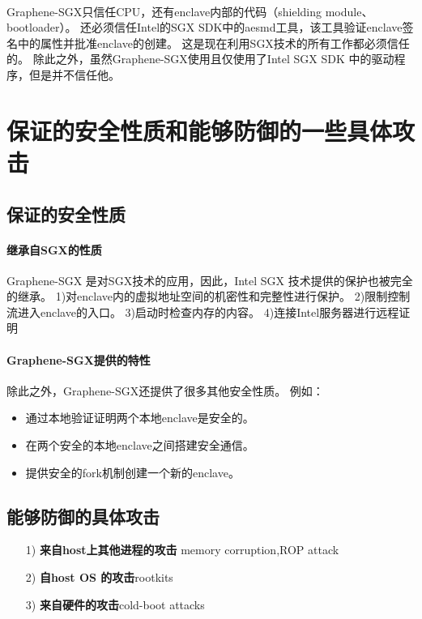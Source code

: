\documentclass{article}
\begin{document}
\paragraph{}
Graphene-SGX只信任CPU，还有enclave内部的代码（shielding module、bootloader）。
还必须信任Intel的SGX SDK中的aesmd工具，该工具验证enclave签名中的属性并批准enclave的创建。
这是现在利用SGX技术的所有工作都必须信任的。
除此之外，虽然Graphene-SGX使用且仅使用了Intel SGX SDK 中的驱动程序，但是并不信任他。

\section{保证的安全性质和能够防御的一些具体攻击}
\subsection{保证的安全性质}
\paragraph{继承自SGX的性质}
Graphene-SGX 是对SGX技术的应用，因此，Intel SGX 技术提供的保护也被完全的继承。
1)对enclave内的虚拟地址空间的机密性和完整性进行保护。
2)限制控制流进入enclave的入口。
3)启动时检查内存的内容。
4)连接Intel服务器进行远程证明

\paragraph{Graphene-SGX提供的特性}
除此之外，Graphene-SGX还提供了很多其他安全性质。
例如：
\begin{itemize}
    \item 通过本地验证证明两个本地enclave是安全的。
    \item 在两个安全的本地enclave之间搭建安全通信。
    \item 提供安全的fork机制创建一个新的enclave。
\end{itemize}

\subsection{能够防御的具体攻击}
\begin{itemize}
    \item [1)]\textbf{来自host上其他进程的攻击} memory corruption,ROP attack
    \item [2)]\textbf{自host OS 的攻击}rootkits
    \item [3)]\textbf{来自硬件的攻击}cold-boot attacks
\end{itemize}
\end{document}
